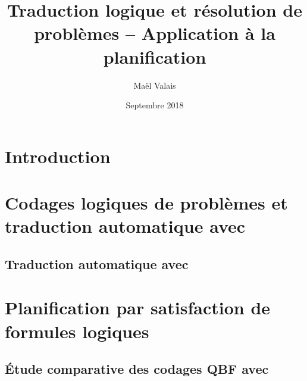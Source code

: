 \documentclass[a4paper,12pt,oneside]{extbook}
\title{Traduction logique et résolution de problèmes -- Application à la planification}
\author{Maël Valais}
\date{Septembre 2018}
\begin{document}
\tableofcontents

\chapter{Introduction}\label{chap:intro}




\chapter{Codages logiques de problèmes et traduction automatique avec \touist}\label{chap:codages}

\section{Traduction automatique avec \touist}\label{chap:touist}






\chapter{Planification par satisfaction de formules logiques}


\section{Étude comparative des codages QBF avec \touist} %
\end{document}
